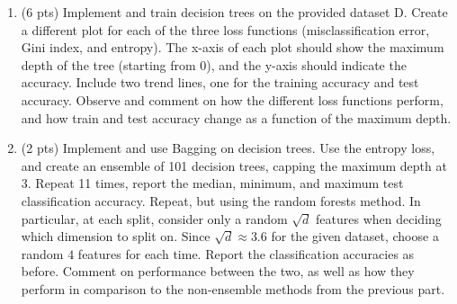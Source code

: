 \documentclass[10pt,letter,notitlepage]{article}
\newcounter{exercise}
\begin{document}
\begin{exercise}
  \begin{enumerate} [label=\alph*)]
    \item (6 pts) Implement and train decision trees on the provided dataset D. Create a different plot for each of the three loss functions (misclassification error, Gini index, and entropy). The x-axis of each plot should show the maximum depth of the tree (starting from 0), and the y-axis should indicate the accuracy. Include two trend lines, one for the training accuracy and test accuracy. Observe and comment on how the different loss functions perform, and how train and test accuracy change as a function of the maximum depth.
    \item (2 pts) Implement and use Bagging on decision trees. Use the entropy loss, and create an ensemble of 101 decision trees, capping the maximum depth at 3. Repeat 11 times, report the median, minimum, and maximum test classification accuracy.
      Repeat, but using the random forests method. In particular, at each split, consider only a random $\sqrt{d}$ features when deciding which dimension to split on. Since $\sqrt{d} \approx 3.6$ for the given dataset, choose a random $4$ features for each time.
      Report the classification accuracies as before.
      Comment on performance between the two, as well as how they perform in comparison to the non-ensemble methods from the previous part.
  \end{enumerate}
\end{exercise}
\end{document}
